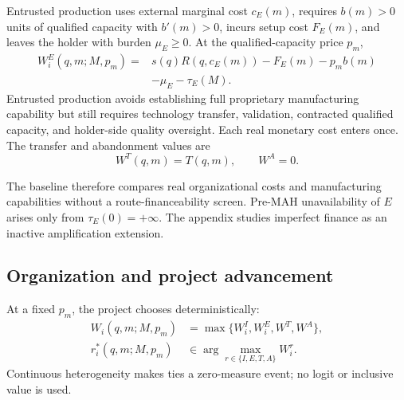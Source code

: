 \documentclass[12pt]{article}
\newcommand{\1}{\mathbf{1}}
\begin{document}
Entrusted production uses external marginal cost \(c_E(m)\), requires
\(b(m)>0\) units of qualified capacity with \(b'(m)>0\), incurs setup cost
\(F_E(m)\), and leaves the holder with burden \(\mu_E\geq0\). At the
qualified-capacity price \(p_m\),
\begin{equation}
  \begin{aligned}
  W_i^E(q,m;M,p_m)
  ={}&
  s(q)R\!\left(q,c_E(m)\right)-F_E(m)-p_mb(m)\\
  &-\mu_E-\tau_E(M).
  \end{aligned}
  \label{eq:p16m-entrusted}
\end{equation}
Entrusted production avoids establishing full proprietary manufacturing
capability but still requires technology transfer, validation, contracted
qualified capacity, and holder-side quality oversight. Each real monetary
cost enters once.
The transfer and abandonment values are
\begin{equation}
  W^T(q,m)=T(q,m),
  \qquad
  W^A=0.
  \label{eq:p16m-outside}
\end{equation}

The baseline therefore compares real organizational costs and manufacturing
capabilities without a route-financeability screen. Pre-MAH unavailability of
\(E\) arises only from \(\tau_E(0)=+\infty\). The appendix studies imperfect
finance as an inactive amplification extension.

\subsection{Organization and project advancement}
\label{subsec:p16m-organization}

At a fixed \(p_m\), the project chooses deterministically:
\begin{equation}
  \begin{aligned}
  W_i(q,m;M,p_m)
  &=
  \max\{W_i^I,W_i^E,W^T,W^A\},\\
  r_i^*(q,m;M,p_m)
  &\in
  \arg\max_{r\in\{I,E,T,A\}} W_i^r.
  \end{aligned}
  \label{eq:p16m-route-choice}
\end{equation}
Continuous heterogeneity makes ties a zero-measure event; no logit or
inclusive value is used.
\end{document}
